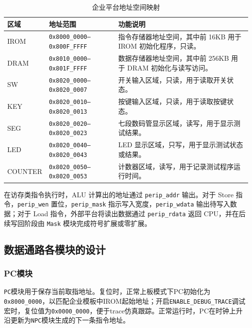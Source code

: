 \documentclass[12pt,a4paper]{ctexart}
\newcommand{\code}[1]{\texttt{#1}}
\begin{document}
\begin{table}[H]
	\centering
	\caption{企业平台地址空间映射}
	\footnotesize
	\renewcommand{\arraystretch}{1.2}
	\begin{tabularx}{\textwidth}{p{3cm}p{4.2cm}X}
		\toprule
		区域      & 地址范围                              & 功能说明                                  \\
		\midrule
		IROM    & \code{0x8000\_0000--0x800F\_FFFF} & 指令存储器地址空间，其中前 16KB 用于 IROM 初始化程序，只读。  \\
		DRAM    & \code{0x8010\_0000--0x801F\_FFFF} & 数据存储器地址空间，其中前 256KB 用于 DRAM 初始化与读写访问。 \\
		SW      & \code{0x8020\_0000--0x8020\_0007} & 开关输入区域，只读，用于读取开关状态。                   \\
		KEY     & \code{0x8020\_0010--0x8020\_0013} & 按键输入区域，只读，用于读取按键状态。                   \\
		SEG     & \code{0x8020\_0020--0x8020\_0023} & 七段数码管显示区域，读写，用于显示测试结果。                \\
		LED     & \code{0x8020\_0040--0x8020\_0043} & LED 显示区域，只写，用于显示测试状态或结果。              \\
		COUNTER & \code{0x8020\_0050--0x8020\_0053} & 计数器区域，读写，用于记录测试程序运行时间。                \\
		\bottomrule
	\end{tabularx}
\end{table}

在访存类指令执行时，ALU 计算出的地址通过 \code{perip\_addr} 输出。对于 Store 指令，\code{perip\_wen} 置位，\code{perip\_mask} 指示写入宽度，\code{perip\_wdata} 输出待写入数据；对于 Load 指令，外部平台将读出数据通过 \code{perip\_rdata} 返回 CPU，并在后续写回阶段由 \code{Mask} 模块完成符号扩展或零扩展。

\subsection{数据通路各模块的设计}

\subsubsection{PC模块}

\code{PC}模块用于保存当前取指地址。复位时，正常上板模式下PC初始化为\code{0x8000\_0000}，以匹配企业模板中IROM起始地址；开启\code{ENABLE\_DEBUG\_TRACE}调试宏时，复位值为\code{0x0000\_0000}，便于trace仿真跟踪。正常运行时，PC在时钟上升沿更新为\code{NPC}模块生成的下一条指令地址。
\end{document}
